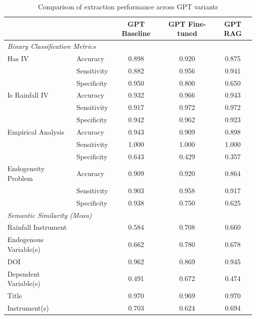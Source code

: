\begin{table}[htbp]
\centering
\caption{Comparison of extraction performance across GPT variants}
\label{tab:model_comparison}
\begin{tabular}{llccc}
\toprule
 & & GPT Baseline & GPT Fine-tuned & GPT RAG \\
\midrule
\multicolumn{5}{l}{\textit{Binary Classification Metrics}} \\
Has IV & Accuracy & 0.898 & 0.920 & 0.875 \\
 & Sensitivity & 0.882 & 0.956 & 0.941 \\
 & Specificity & 0.950 & 0.800 & 0.650 \\
Is Rainfall IV & Accuracy & 0.932 & 0.966 & 0.943 \\
 & Sensitivity & 0.917 & 0.972 & 0.972 \\
 & Specificity & 0.942 & 0.962 & 0.923 \\
Empirical Analysis & Accuracy & 0.943 & 0.909 & 0.898 \\
 & Sensitivity & 1.000 & 1.000 & 1.000 \\
 & Specificity & 0.643 & 0.429 & 0.357 \\
Endogeneity Problem & Accuracy & 0.909 & 0.920 & 0.864 \\
 & Sensitivity & 0.903 & 0.958 & 0.917 \\
 & Specificity & 0.938 & 0.750 & 0.625 \\
\midrule
\multicolumn{5}{l}{\textit{Semantic Similarity (Mean)}} \\
Rainfall Instrument & & 0.584 & 0.708 & 0.660 \\
Endogenous Variable(s) & & 0.662 & 0.780 & 0.678 \\
DOI & & 0.962 & 0.869 & 0.945 \\
Dependent Variable(s) & & 0.491 & 0.672 & 0.474 \\
Title & & 0.970 & 0.969 & 0.970 \\
Instrument(s) & & 0.703 & 0.624 & 0.694 \\
\bottomrule
\end{tabular}
\end{table}
